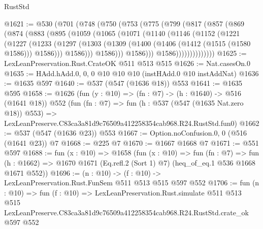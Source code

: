 \begin{lexlean}{RustStd}
\begin{coremodule}
@1621 := @530
    (@701
      (@748
        (@750
          (@753
            (@775
              (@799
                (@817
                  (@857
                    (@869
                      (@874
                        (@883
                          (@895
                            (@1059
                              (@1065
                                (@1071
                                  (@1140
                                    (@1146
                                      (@1152
                                        (@1221
                                          (@1227
                                            (@1233
                                              (@1297
                                                (@1303
                                                  (@1309
                                                    (@1400
                                                      (@1406 (@1412 (@1515 (@1580 @1586))) @1586)))
                                                  @1586)))
                                            @1586)))
                                      @1586)))
                                @1586))))))))))))))
@1625 := LexLeanPreservation.Rust.CrateOK @511 @513 @515
@1626 := Nat.casesOn.{0}
@1635 := HAdd.hAdd.{0, 0, 0} @10 @10 @10 (instHAdd.{0} @10 instAddNat)
@1636 := @1635 @597
@1640 := @537 (@547 (@1636 @18)) @553
@1641 := @1635 @595
@1658 := @1626
    (fun (y : @10) => (fn : @7) -> (h : @1640) -> @516 (@1641 @18))
    @552
    (fun (fn : @7) =>
    fun (h : @537 (@547 (@1635 Nat.zero @18)) @553) =>
    LexLeanPreserve.C83ca3a81d9c76509a412258354cab968.R24.RustStd.fun0)
@1662 := @537 (@547 (@1636 @23)) @553
@1667 := Option.noConfusion.{0, 0} (@516 (@1641 @23)) @7
@1668 := @225 @7
@1670 := @1667 @1668 @7
@1671 := @551 @597
@1688 := fun (x : @10) =>
  @1658
    (fun (x : @10) =>
    fun (fn : @7) =>
    fun (h : @1662) => @1670 @1671 (Eq.refl.{2} (Sort 1) @7) (heq_of_eq.{1} @536 @1668 @1671 @552))
@1696 := (n : @10) -> (f : @10) -> LexLeanPreservation.Rust.FunSem @511 @513 @515 @597 @552
@1706 := fun (n : @10) =>
  fun (f : @10) =>
  LexLeanPreservation.Rust.simulate
    @511
    @513
    @515
    LexLeanPreserve.C83ca3a81d9c76509a412258354cab968.R24.RustStd.crate_ok
    @597
    @552
\end{coremodule}
\end{lexlean}
